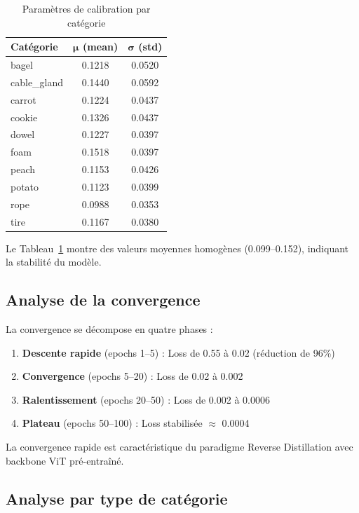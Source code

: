 \documentclass[12pt,a4paper,oneside]{report}
\begin{document}
\begin{table}[H]
\centering
\caption{Paramètres de calibration par catégorie}
\label{tab:calibration}
\begin{tabularx}{\textwidth}{X c c}
\toprule
\textbf{Catégorie} & $\boldsymbol{\mu}$ \textbf{(mean)} & $\boldsymbol{\sigma}$ \textbf{(std)} \\
\midrule
\rowcolor{tableheader} bagel & 0.1218 & 0.0520 \\
cable\_gland & 0.1440 & 0.0592 \\
\rowcolor{tableheader} carrot & 0.1224 & 0.0437 \\
cookie & 0.1326 & 0.0437 \\
\rowcolor{tableheader} dowel & 0.1227 & 0.0397 \\
foam & 0.1518 & 0.0397 \\
\rowcolor{tableheader} peach & 0.1153 & 0.0426 \\
potato & 0.1123 & 0.0399 \\
\rowcolor{tableheader} rope & 0.0988 & 0.0353 \\
tire & 0.1167 & 0.0380 \\
\bottomrule
\end{tabularx}
\end{table}

Le Tableau~\ref{tab:calibration} montre des valeurs moyennes homogènes (0.099--0.152), indiquant la stabilité du modèle.

\subsection{Analyse de la convergence}

La convergence se décompose en quatre phases :
\begin{enumerate}
    \item \textbf{Descente rapide} (epochs 1--5) : Loss de 0.55 à 0.02 (réduction de 96\%)
    \item \textbf{Convergence} (epochs 5--20) : Loss de 0.02 à 0.002
    \item \textbf{Ralentissement} (epochs 20--50) : Loss de 0.002 à 0.0006
    \item \textbf{Plateau} (epochs 50--100) : Loss stabilisée $\approx$ 0.0004
\end{enumerate}

La convergence rapide est caractéristique du paradigme Reverse Distillation avec backbone ViT pré-entraîné.

\subsection{Analyse par type de catégorie}
\end{document}
